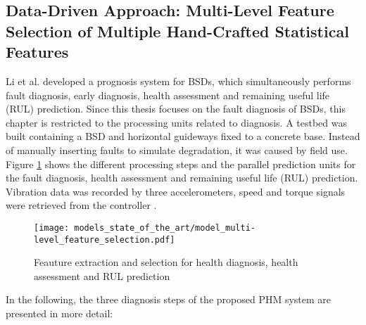 \subsection{Data-Driven Approach: Multi-Level Feature Selection of Multiple Hand-Crafted Statistical Features}
Li et al. \cite{LiPin2018} developed a prognosis system for BSDs, which simultaneously performs fault diagnosis, early diagnosis, health assessment and remaining useful life (RUL) prediction. Since this thesis focuses on the fault diagnosis of BSDs, this chapter is restricted to the processing units related to diagnosis. A testbed was built containing a BSD and horizontal guideways fixed to a concrete base. Instead of manually inserting faults to simulate degradation, it was caused by field use. Figure \ref{fig:level_feature_selection_model} shows the different processing steps and the parallel prediction units for the fault diagnosis, health assessment and remaining useful life (RUL) prediction. Vibration data was recorded by three accelerometers, speed and torque signals were retrieved from the controller \cite{LiPin2018}. 

\begin{figure}[H]
  \centering
  \texttt{[image: models\_state\_of\_the\_art/model\_multi-level\_feature\_selection.pdf]}
  \caption{Feauture extraction and selection for health diagnosis, health assessment and RUL prediction \cite{LiPin2018}}
  \label{fig:level_feature_selection_model}
\end{figure}

In the following, the three diagnosis steps of the proposed PHM system are presented in more detail:

